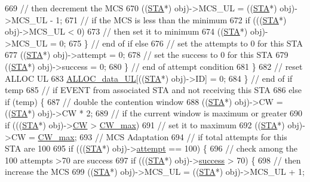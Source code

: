\begin{DoxyCode}
{{669                     \textcolor{comment}{// then decrement the MCS}
670                     ((\hyperlink{classSTA}{STA}*) obj)->MCS\_UL = ((\hyperlink{classSTA}{STA}*) obj)->MCS\_UL - 1;
671                     \textcolor{comment}{// if the MCS is less than the minimum}
672                     \textcolor{keywordflow}{if} (((\hyperlink{classSTA}{STA}*) obj)->MCS\_UL < 0)
673                         \textcolor{comment}{// then set it to minimum}
674                         ((\hyperlink{classSTA}{STA}*) obj)->MCS\_UL = 0;
675                 \} \textcolor{comment}{// end of if else}
676                   \textcolor{comment}{// set the attempts to 0 for this STA}
677                 ((\hyperlink{classSTA}{STA}*) obj)->attempt = 0;
678                 \textcolor{comment}{// set the success to 0 for this STA}
679                 ((\hyperlink{classSTA}{STA}*) obj)->success = 0;
680             \} \textcolor{comment}{// end of attempt condition}
681         \}
682         \textcolor{comment}{// reset ALLOC UL}
683         \hyperlink{classAP_ae5567916229fb09fbb83af3cfad5d71d}{ALLOC\_data\_UL}[((\hyperlink{classSTA}{STA}*) obj)->ID] = 0;
684     \} \textcolor{comment}{// end of if temp}
685       \textcolor{comment}{// if EVENT from associated STA and not receiving this STA}
686     \textcolor{keywordflow}{else} \textcolor{keywordflow}{if} (temp) \{
687         \textcolor{comment}{// double the contention window}
688         ((\hyperlink{classSTA}{STA}*) obj)->CW = ((\hyperlink{classSTA}{STA}*) obj)->CW * 2;
689         \textcolor{comment}{// if the current window is maximum or greater}
690         \textcolor{keywordflow}{if} (((\hyperlink{classSTA}{STA}*) obj)->\hyperlink{classAP_a5f5fc6fd5279167b196a6387ff49825b}{CW} > \hyperlink{classAP_a3351a0a344c4a96a5a185aea2609fa7c}{CW\_max})
691             \textcolor{comment}{// set it to maximum}
692             ((\hyperlink{classSTA}{STA}*) obj)->CW = \hyperlink{classAP_a3351a0a344c4a96a5a185aea2609fa7c}{CW\_max};
693         \textcolor{comment}{// MCS Adaptation}
694         \textcolor{comment}{// if total attempts for this STA are 100}
695         \textcolor{keywordflow}{if} (((\hyperlink{classSTA}{STA}*) obj)->\hyperlink{classAP_aa15c857fb5fb5d7688f1ee49d43a2aee}{attempt} == 100) \{
696             \textcolor{comment}{// check among the 100 attempts >70 are success}
697             \textcolor{keywordflow}{if} (((\hyperlink{classSTA}{STA}*) obj)->\hyperlink{classAP_aa9d8130f487d3ba13dc6b22fe5e3868d}{success} > 70) \{
698                 \textcolor{comment}{// then increase the MCS}
699                 ((\hyperlink{classSTA}{STA}*) obj)->MCS\_UL = ((\hyperlink{classSTA}{STA}*) obj)->MCS\_UL + 1;
}}
\end{DoxyCode}
